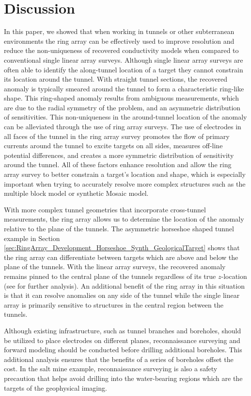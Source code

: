 \documentclass[preprint,authoryear,12pt]{elsarticle}
\begin{document}
\section{Discussion}
\label{Discussion}


In this paper, we showed that when working in tunnels or other subterranean environments the ring array can be effectively used to improve resolution and reduce the non-uniqueness of recovered conductivity models when compared to conventional single linear array surveys. Although single linear array surveys are often able to identify the along-tunnel location of a target they cannot constrain its location around the tunnel. With straight tunnel sections, the recovered anomaly is typically smeared around the tunnel to form a characteristic ring-like shape. This ring-shaped anomaly results from ambiguous measurements, which are due to the radial symmetry of the problem, and an asymmetric distribution of sensitivities. This non-uniqueness in the around-tunnel location of the anomaly can be alleviated through the use of ring array surveys. The use of electrodes in all faces of the tunnel in the ring array survey promotes the flow of primary currents around the tunnel to excite targets on all sides, measures off-line potential differences, and creates a more symmetric distribution of sensitivity around the tunnel. All of these factors enhance resolution and allow the ring array survey to better constrain a target's location and shape, which is especially important when trying to accurately resolve more complex structures such as the multiple block model or synthetic Mosaic model.

With more complex tunnel geometries that incorporate cross-tunnel measurements, the ring array allows us to determine the location of the anomaly relative to the plane of the tunnels. The asymmetric horseshoe shaped tunnel example in Section \ref{sec:RingArray_Development_Horseshoe_Synth_GeologicalTarget} shows that the ring array can differentiate between targets which are above and below the plane of the tunnels. With the linear array surveys, the recovered anomaly remains pinned to the central plane of the tunnels regardless of its true $z$-location (see \citet{Mitchell2020} for further analysis). An additional benefit of the ring array in this situation is that it can resolve anomalies on any side of the tunnel while the single linear array is primarily sensitive to structures in the central region between the tunnels.

Although existing infrastructure, such as tunnel branches and boreholes, should be utilized to place electrodes on different planes, reconnaissance surveying and forward modeling should be conducted before drilling additional boreholes. This additional analysis ensures that the benefits of a series of boreholes offset the cost. In the salt mine example, reconnaissance surveying is also a safety precaution that helps avoid drilling into the water-bearing regions which are the targets of the geophysical imaging.
\end{document}
